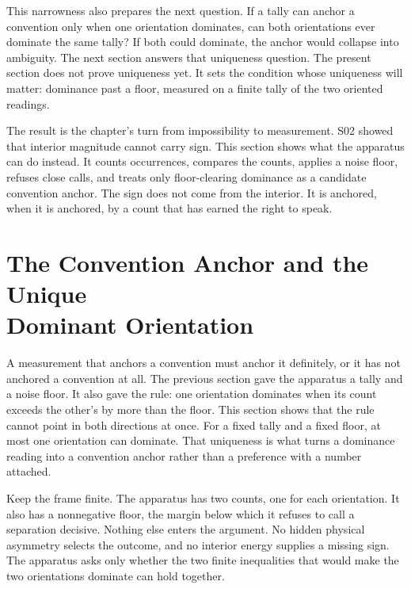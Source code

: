 This narrowness also prepares the next question. If a tally can anchor a
convention only when one orientation dominates, can both orientations ever
dominate the same tally? If both could dominate, the anchor would collapse into
ambiguity. The next section answers that uniqueness question. The present
section does not prove uniqueness yet. It sets the condition whose uniqueness
will matter: dominance past a floor, measured on a finite tally of the two
oriented readings.

The result is the chapter's turn from impossibility to measurement. S02 showed
that interior magnitude cannot carry sign. This section shows what the
apparatus can do instead. It counts occurrences, compares the counts, applies a
noise floor, refuses close calls, and treats only floor-clearing dominance as a
candidate convention anchor. The sign does not come from the interior. It is
anchored, when it is anchored, by a count that has earned the right to speak.

\section[The Convention Anchor]{The Convention Anchor and the Unique\\ Dominant Orientation}

A measurement that anchors a convention must anchor it definitely, or it has
not anchored a convention at all. The previous section gave the apparatus a
tally and a noise floor. It also gave the rule: one orientation dominates when
its count exceeds the other's by more than the floor. This section shows that
the rule cannot point in both directions at once. For a fixed tally and a fixed
floor, at most one orientation can dominate. That uniqueness is what turns a
dominance reading into a convention anchor rather than a preference with a
number attached.

Keep the frame finite. The apparatus has two counts, one for each orientation.
It also has a nonnegative floor, the margin below which it refuses to call a
separation decisive. Nothing else enters the argument. No hidden physical
asymmetry selects the outcome, and no interior energy supplies a missing sign.
The apparatus asks only whether the two finite inequalities that would make the
two orientations dominate can hold together.

